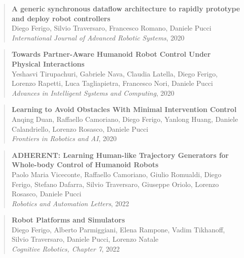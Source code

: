 \begin{quote}
    \onehalfspacing
    \textbf{A generic synchronous dataflow architecture to rapidly prototype and deploy robot controllers} \\[0.75mm]
    Diego Ferigo, Silvio Traversaro, Francesco Romano, Daniele Pucci \\[0.75mm]
    \textit{International Journal of Advanced Robotic Systems}, 2020
\end{quote}

\begin{quote}
    \onehalfspacing
    \textbf{Towards Partner-Aware Humanoid Robot Control Under Physical Interactions} \\[0.75mm]
    Yeshasvi Tirupachuri, Gabriele Nava, Claudia Latella, Diego Ferigo, Lorenzo Rapetti, Luca Tagliapietra, Francesco Nori, Daniele Pucci \\[0.75mm]
    \textit{Advances in Intelligent Systems and Computing}, 2020
\end{quote}

\begin{quote}
    \onehalfspacing
    \textbf{Learning to Avoid Obstacles With Minimal Intervention Control} \\[0.75mm]
    Anqing Duan, Raffaello Camoriano, Diego Ferigo, Yanlong Huang, Daniele Calandriello, Lorenzo Rosasco, Daniele Pucci \\[0.75mm]
    \textit{Frontiers in Robotics and AI}, 2020
\end{quote}

\begin{quote}
    \onehalfspacing
    \textbf{ADHERENT: Learning Human-like Trajectory Generators for Whole-body Control of Humanoid Robots} \\[0.75mm]
    Paolo Maria Viceconte, Raffaello Camoriano, Giulio Romualdi, Diego Ferigo, Stefano Dafarra, Silvio Traversaro, Giuseppe Oriolo, Lorenzo Rosasco, Daniele Pucci \\[0.75mm]
    \textit{Robotics and Automation Letters}, 2022
\end{quote}

\begin{quote}
    \onehalfspacing
    \textbf{Robot Platforms and Simulators} \\[0.75mm]
    Diego Ferigo, Alberto Parmiggiani, Elena Rampone, Vadim Tikhanoff, Silvio Traversaro, Daniele Pucci, Lorenzo Natale \\[0.75mm]
    \textit{Cognitive Robotics, Chapter 7}, 2022
\end{quote}

